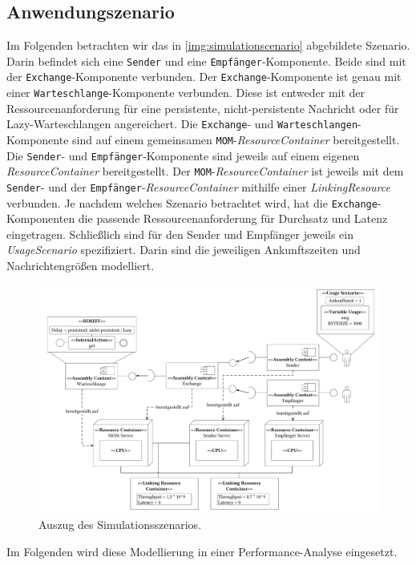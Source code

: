 \subsection{Anwendungszenario}
Im Folgenden betrachten wir das in \autoref{img:simulationscenario} abgebildete Szenario. Darin befindet sich eine \texttt{Sender} und eine \texttt{Empfänger}-Komponente. Beide sind mit der \texttt{Exchange}-Komponente verbunden. Der \texttt{Exchange}-Komponente ist genau mit einer \texttt{Warteschlange}-Komponente verbunden. Diese ist entweder mit der Ressourcenanforderung für eine persistente, nicht-persistente Nachricht oder für Lazy-Warteschlangen angereichert. Die \texttt{Exchange}- und \texttt{Warteschlangen}-Komponente sind auf einem gemeinsamen \texttt{MOM}-\emph{ResourceContainer} bereitgestellt. Die \texttt{Sender}- und \texttt{Empfänger}-Komponente sind jeweils auf einem eigenen \emph{ResourceContainer} bereitgestellt. Der \texttt{MOM}-\emph{ResourceContainer} ist jeweils mit dem \texttt{Sender}- und der \texttt{Empfänger}-\emph{ResourceContainer} mithilfe einer \emph{LinkingResource} verbunden. Je nachdem welches Szenario betrachtet wird, hat die \texttt{Exchange}-Komponenten die passende Ressourcenanforderung für Durchsatz und Latenz eingetragen. Schließlich sind für den Sender und Empfänger jeweils ein \emph{UsageScenario} spezifiziert. Darin sind die jeweiligen Ankunftszeiten und Nachrichtengrößen modelliert.
\begin{figure}
\center
  \includegraphics[width=1.35\textwidth, angle=90]{images/modelling/modelingSimulationSzenario.pdf}
  \caption{Auszug des Simulationsszenarios.}
  \label{img:simulationscenario}
\end{figure}
Im Folgenden wird diese Modellierung in einer Performance-Analyse eingesetzt.


